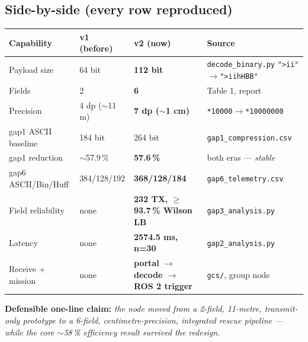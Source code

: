 \documentclass[11pt,a4paper]{article}
\begin{document}
\subsection{Side-by-side (every row reproduced)}
\begin{longtable}{@{}p{3.1cm} p{2.6cm} p{3.4cm} p{3.6cm}@{}}
\toprule
\textbf{Capability} & \textbf{v1 (before)} & \textbf{v2 (now)} & \textbf{Source} \\
\midrule
\endhead
Payload size & 64 bit & \textbf{112 bit} & \texttt{decode\_binary.py} \texttt{">ii"}$\to$\texttt{">iihHBB"} \\
Fields & 2 & \textbf{6} & Table 1, report \\
Precision & 4 dp ($\sim$11 m) & \textbf{7 dp ($\sim$1 cm)} & \texttt{*10000}$\to$\texttt{*10000000} \\
gap1 ASCII baseline & 184 bit & 264 bit & \texttt{gap1\_compression.csv} \\
gap1 reduction & $\sim$57.9\,\% & \textbf{57.6\,\%} & both eras --- \emph{stable} \\
gap6 ASCII/Bin/Huff & 384/128/192 & \textbf{368/128/184} & \texttt{gap6\_telemetry.csv} \\
Field reliability & none & \textbf{232 TX, $\ge$93.7\,\% Wilson LB} & \texttt{gap3\_analysis.py} \\
Latency & none & \textbf{2574.5 ms, n=30} & \texttt{gap2\_analysis.py} \\
Receive + mission & none & \textbf{portal $\to$ decode $\to$ ROS 2 trigger} & \texttt{gcs/}, group node \\
\bottomrule
\end{longtable}

\textbf{Defensible one-line claim:} \emph{the node moved from a 2-field, 11-metre,
transmit-only prototype to a 6-field, centimetre-precision, integrated rescue pipeline ---
while the core $\sim$58\,\% efficiency result survived the redesign.}
\end{document}
